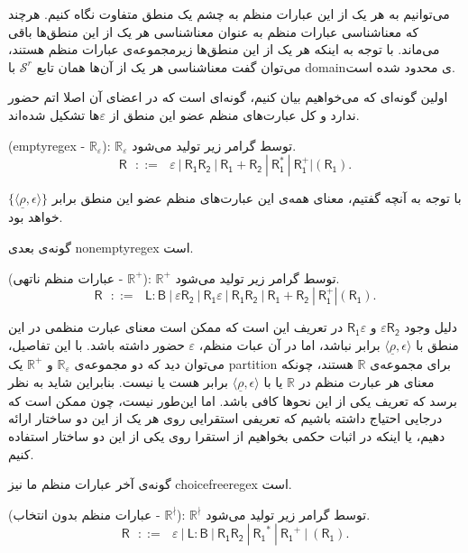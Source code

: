 می‌توانیم به هر یک از این عبارات منظم به چشم یک منطق متفاوت نگاه کنیم. هرچند که معناشناسی عبارات منظم به عنوان معناشناسی هر یک از این منطق‌ها باقی می‌ماند. با توجه به اینکه هر یک از این منطق‌ها زیرمجموعه‌ی عبارات منظم هستند، می‌توان گفت معناشناسی هر یک از آن‌ها همان تابع $\mathcal{S}^r$ با \gls*{domain}ی محدود شده است.

اولین گونه‌ای که می‌خواهیم بیان کنیم، گونه‌ای است که در اعضای آن اصلا اتم حضور ندارد و کل عبارت‌های منظم عضو این منطق از $\varepsilon$ها تشکیل شده‌اند.
\begin{defn}
	(\gls{emptyregex} - $\mathbb{R_\varepsilon}$): 
	$\mathbb{R}_\varepsilon$ 
	توسط گرامر زیر تولید می‌شود.
	$$\mathsf{R}\:\:\: ::= \:\:\: \varepsilon \: | \: \mathsf{R_1 R_2} \: | 
	\: \mathsf{R_1 + R_2} \: | \: \mathsf{R_1^*} \: | \: \mathsf{R_1^+} | (\mathsf{R_1}).$$
\end{defn}


 با توجه به آنچه گفتیم، معنای همه‌ی این عبارت‌های منظم عضو این منطق برابر 
$\{\langle \underline{\rho} , \epsilon \rangle\}$
خواهد بود.

گونه‌ی بعدی \gls{nonemptyregex} است.
\begin{defn}
	(عبارات منظم ناتهی - $\mathbb{R}^+$):
$\mathbb{R}^+$ توسط گرامر زیر تولید می‌شود.
	$$\mathsf{R}\:\:\: ::= \:\:\: \mathsf{L:B} \: |
	\: \mathsf{\varepsilon R_2} \: | \: \mathsf{R_1 \varepsilon} \: |
	\: \mathsf{R_1 R_2} \: | 
	\: \mathsf{R_1 + R_2} \: | \: \mathsf{R_1^+} | (\mathsf{R_1}).$$
\end{defn}
دلیل وجود 
$\mathsf{\varepsilon R_2}$
و 
$\mathsf{R_1 \varepsilon}$
در تعریف این است که ممکن است معنای عبارت منظمی در این منطق با ${\langle \underline{\rho} , \epsilon \rangle}$ برابر نباشد، اما در آن عبات منظم، $\varepsilon$ حضور داشته باشد. با این تفاصیل، می‌توان دید که دو مجموعه‌ی 
$\mathbb{R}_\varepsilon$
و
$\mathbb{R}^+$
یک \gls*{partition} برای مجموعه‌ی $\mathbb{R}$ هستند، چونکه معنای هر عبارت منظم در $\mathbb{R}$ یا با ${\langle \underline{\rho} , \epsilon \rangle}$ برابر هست یا نیست. بنابراین شاید به نظر برسد که تعریف یکی از این نحوها کافی باشد. اما این‌طور نیست، چون ممکن است که درجایی احتیاج داشته باشیم که تعریفی استقرایی روی هر یک از این دو ساختار ارائه دهیم، یا اینکه در اثبات حکمی بخواهیم از استقرا روی یکی از این دو ساختار استفاده کنیم.

گونه‌ی آخر عبارات منظم ما نیز \gls{choicefreeregex} است.
\begin{defn}
(عبارات منظم بدون انتخاب - $\mathbb{R}^\nmid$):
$\mathbb{R}^\nmid$ توسط گرامر زیر تولید می‌شود.
$$
\mathsf{R}\:\:\: ::= \:\:\: \varepsilon \: | \: \mathsf{L:B} \: | \:
\mathsf{R_1 R_2} \: | \: \mathsf{R_1}^* \: | \: \mathsf{R_1}^+ \: | \:
(\mathsf{R_1}).$$
\end{defn}

